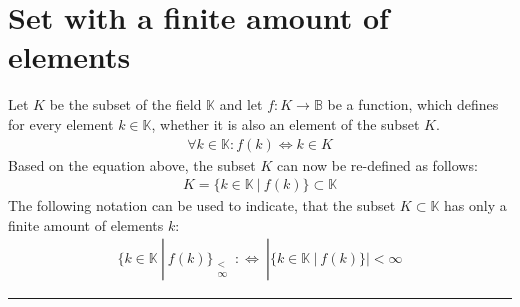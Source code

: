 \documentclass[pdftex,12pt,a4paper]{report}
\newcommand{\sfa}{_{\substack{ < \\ \infty }}}
\begin{document}
    \section{Set with a finite amount of elements}
    Let $ K $ be the subset of the field $ \mathbb{K} $ and let $ f : K \rightarrow \mathbb{B} $ be a function, which defines for every element $ k \in \mathbb{K} $, whether it is also an element of the subset $ K $.
    \begin{equation*}
        \begin{aligned}
            \forall k \in \mathbb{K} : f (k) \Leftrightarrow k \in K
        \end{aligned}
    \end{equation*}
    Based on the equation above, the subset $ K $ can now be re-defined as follows:
    \begin{equation*}
        \begin{aligned}
            K = \{ k \in \mathbb{K} \ |\ f (k) \} \subset \mathbb{K}
        \end{aligned}
    \end{equation*}
    The following notation can be used to indicate, that the subset $ K \subset \mathbb{K} $ has only a finite amount of elements $ k $:
    \begin{equation*}
        \begin{aligned}
            \{ k \in \mathbb{K} \ |\ f (k) \}\sfa \ :\Leftrightarrow \ | \{ k \in \mathbb{K} \ |\ f (k) \} | < \infty
        \end{aligned}
    \end{equation*}
    \vspace{5mm} \hrule \vspace{5mm}
\end{document}
